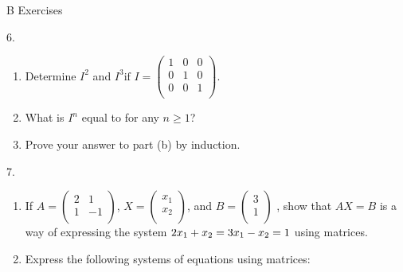 \documentclass[10pt,]{book}
\theoremstyle{plain}
\theoremstyle{definition}
\theoremstyle{definition}
\theoremstyle{definition}
\theoremstyle{definition}
\begin{document}
\par\smallskip\noindent
\hypertarget{exercisegroup-2}{}\typeout{************************************************}
\typeout{************************************************}
B Exercises%
\begin{exercisegroup}
\item[6.]\hypertarget{exercise-6}{}\leavevmode%
\begin{enumerate}[label=\alph*]
\item\hypertarget{li-32}{} Determine \(I^2\) and \(I^3 \text{if}\) \(I = \left(
\begin{array}{ccc}
 1 & 0 & 0 \\
 0 & 1 & 0 \\
 0 & 0 & 1 \\
\end{array}
\right)\).%
\item\hypertarget{li-33}{} What is \(I^n\) equal to for any \(n\geq 1\)?%
\item\hypertarget{li-34}{} Prove your answer to part (b) by induction.%
\end{enumerate}
%
\par\smallskip
\item[7.]\hypertarget{exercise-7}{}\leavevmode%
\begin{enumerate}[label=\alph*]
\item\hypertarget{li-35}{}If \(A =\left(
\begin{array}{cc}
 2 & 1 \\
 1 & -1 \\
\end{array}
\right)\), \(X =\left(
\begin{array}{c}
 x_1 \\
 x_2 \\
\end{array}
\right)\), and \(B =\left(
\begin{array}{c}
 3 \\
 1 \\
\end{array}
\right)\) , show that \(A X =B\) is a way of expressing the system  
    \(2x_1 + x_2 = 3\\ \\ x_1 - x_2= 1\)  using matrices.%
\item\hypertarget{li-36}{} Express the following systems of equations using matrices:%
\par
%
\begin{multicols}{2}
\begin{enumerate}[label=\roman*]

\end{enumerate}
\end{multicols}
\end{enumerate}
\end{exercisegroup}
\end{document}
